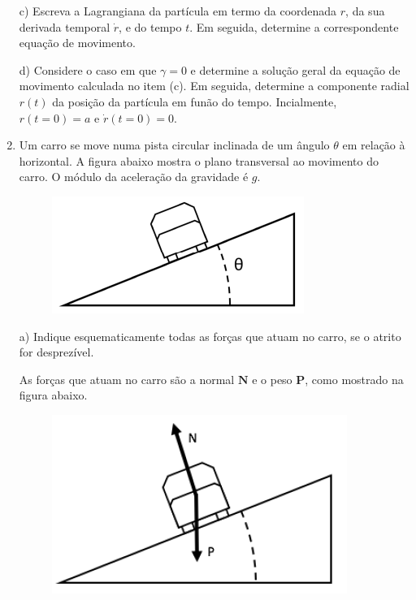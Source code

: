 \begin{enumerate}[start=1,label={\bfseries Q\arabic*.}]
\resposta

c) Escreva a Lagrangiana da partícula em termo da coordenada $r$, da sua derivada temporal $\dot{r}$, e do tempo $t$. Em seguida, determine a correspondente equação de movimento.

\resposta

d) Considere o caso em que $\gamma = 0$ e determine a solução geral da equação de movimento calculada no item (c). Em seguida, determine a componente radial $r(t)$ da posição da partícula em funão do tempo. Incialmente, $r(t=0)=a$ e $\dot{r}(t=0)=0$.

\resposta




\item Um carro se move numa pista circular inclinada de um ângulo $\theta$ em relação à horizontal. A figura abaixo mostra o plano transversal ao movimento do carro. O módulo da aceleração da gravidade é $g$.
\begin{figure}[H]
\centering
\includegraphics[scale=0.8]{classica-img/inclina}
\end{figure}



a) Indique esquematicamente todas as forças que atuam no carro, se o atrito for desprezível.

\resposta As forças que atuam no carro são a normal $\mathbf{N}$ e o peso $\mathbf{P}$, como mostrado na figura abaixo.

\begin{figure}[H]
\centering
\includegraphics[scale=0.8]{classica-img/inclina1}
\end{figure}



\end{enumerate}
